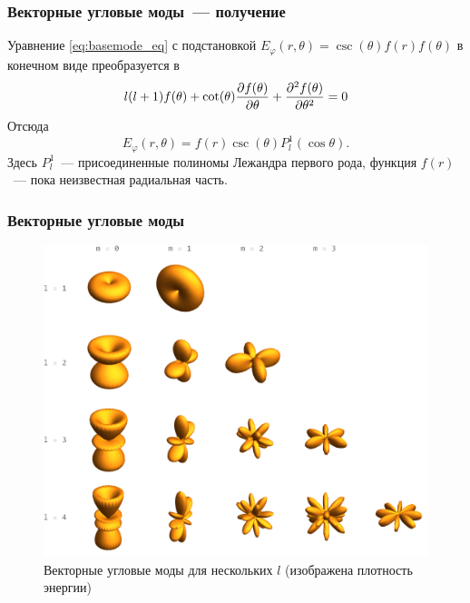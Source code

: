 \documentclass{beamer}
\begin{document}

    \begin{frame}\frametitle{Векторные угловые моды~--- получение}

        Уравнение \autoref{eq:basemode_eq} с подстановкой $E_\varphi(r,\theta) = \csc(\theta) f(r) f(\theta)$ в конечном виде преобразуется в
        \begin{equation}
            l (l + 1) f(\theta)
            + \cot(\theta) \pdv{f(\theta)}{\theta}
            + \pdv[2]{f(\theta)}{\theta} = 0
        \end{equation}
        Отсюда
        \begin{equation}\label{eq:angle_modes_vect}
            E_\varphi(r,\theta) = f(r) \csc(\theta) P^1_l(\cos\theta) .
        \end{equation}
        Здесь $P^1_l$~--- присоединенные полиномы Лежандра первого рода, функция $f(r)$~--- пока неизвестная радиальная часть.

    \end{frame}


    \begin{frame}\frametitle{Векторные угловые моды}

        \begin{figure}[h]
            \centering
            \includegraphics[width=\textwidth,height=0.6\textheight,keepaspectratio]{angle_modes_vect_ii}
            \caption[]{Векторные угловые моды для нескольких $l$ (изображена плотность энергии)}
            \label{fig:angle_modes_vect_ii}
        \end{figure}

    \end{frame}
\end{document}
